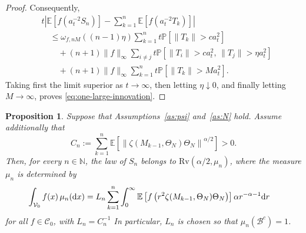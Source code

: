 \documentclass[preprint,12pt]{elsarticle}
\newtheorem{prop}[thm]{Proposition}
\theoremstyle{definition}
\theoremstyle{remark}
\newcommand{\xbf}{{ x}}
\newcommand{\Mbf}{{ M}}
\newcommand{\Nbf}{{ N}}
\newcommand{\Sbf}{{ S}}
\newcommand{\Tbf}{{ T}}
\newcommand{\1}{{\mathbf 1}}
\numberwithin{equation}{section}
\newcommand{\Ebb}{\mathbb{E}}  %
\newcommand{\Pbb}{\mathbb{P}}
\newcommand{\ud}{{\rm d}}
\newcommand{\Vcal}{\mathcal{V}}
\newcommand{\Bcal}{\mathcal{B}}
\begin{document}
\begin{proof}
    Consequently,
    \begin{align*}
      &t\left|
        \Ebb[f(a_t^{-2}S_n)]
        -
        \sum_{k=1}^n\Ebb[f(a_t^{-2}\Tbf_{k})]
      \right| \\
      &\quad\leq
      \omega_{f,nM}((n-1)\eta)
      \sum_{k=1}^n
      t\Pbb[\|\Tbf_k\|>c a_t^2] \\
      &\qquad+
      (n+1)\|f\|_\infty
      \sum_{i\neq j}
      t\Pbb\left[
        \|\Tbf_i\|>c a_t^2,\,
        \|\Tbf_j\|>\eta a_t^2
      \right] \\
      &\qquad+
      (n+1)\|f\|_\infty
      \sum_{k=1}^n
      t\Pbb[\|\Tbf_k\|>M a_t^2].
    \end{align*}
    Taking first the limit superior as $t\to\infty$, then letting
    $\eta\downarrow0$, and finally letting $M\to\infty$, proves \eqref{eq:one-large-innovation}.
  \end{proof}

  \begin{prop}
    Suppose that Assumptions~\ref{as:psi} and~\ref{as:N} hold. Assume additionally that
    \begin{equation*}
      C_n
      :=
      \sum_{k=1}^n
      \Ebb\left[
        \left\|
          \zeta(\Mbf_{k-1},\Theta_\Nbf)\Theta_\Nbf
        \right\|^{\alpha/2}
      \right]
      >0.
    \end{equation*}
    Then, for every $n \in \mathbb{N}$, the law of $\Sbf_n$ belongs to
    $\mathrm{Rv}(\alpha/2,\mu_n)$, where the measure $\mu_n$ is determined by
    \begin{align*}
      \int_{\Vcal_0} f(\xbf)\,\mu_n(\ud\xbf)
      &=
      L_n\sum_{k=1}^n
      \int_0^\infty
      \Ebb\left[
        f\left(
          r^2\zeta(\Mbf_{k-1},\Theta_\Nbf)\Theta_\Nbf
        \right)
      \right]
      \alpha r^{-\alpha-1}\ud r
    \end{align*}
    for all $f\in\mathcal{C}_0$, with
    $L_n=C_n^{-1}$
    In particular, $L_n$ is chosen so that $\mu_n(\Bcal^c)=1$.
  \end{prop}
\end{document}
